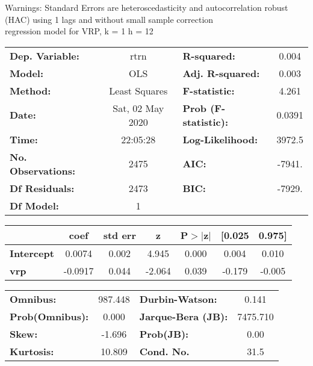 Warnings: \newline
 [1] Standard Errors are heteroscedasticity and autocorrelation robust (HAC) using 1 lags and without small sample correction\\ 

regression model for VRP, k = 1 h = 12\begin{center}
\begin{tabular}{lclc}
\toprule
\textbf{Dep. Variable:}    &       rtrn       & \textbf{  R-squared:         } &     0.004   \\
\textbf{Model:}            &       OLS        & \textbf{  Adj. R-squared:    } &     0.003   \\
\textbf{Method:}           &  Least Squares   & \textbf{  F-statistic:       } &     4.261   \\
\textbf{Date:}             & Sat, 02 May 2020 & \textbf{  Prob (F-statistic):} &   0.0391    \\
\textbf{Time:}             &     22:05:28     & \textbf{  Log-Likelihood:    } &    3972.5   \\
\textbf{No. Observations:} &        2475      & \textbf{  AIC:               } &    -7941.   \\
\textbf{Df Residuals:}     &        2473      & \textbf{  BIC:               } &    -7929.   \\
\textbf{Df Model:}         &           1      & \textbf{                     } &             \\
\bottomrule
\end{tabular}
\begin{tabular}{lcccccc}
                   & \textbf{coef} & \textbf{std err} & \textbf{z} & \textbf{P$> |$z$|$} & \textbf{[0.025} & \textbf{0.975]}  \\
\midrule
\textbf{Intercept} &       0.0074  &        0.002     &     4.945  &         0.000        &        0.004    &        0.010     \\
\textbf{vrp}       &      -0.0917  &        0.044     &    -2.064  &         0.039        &       -0.179    &       -0.005     \\
\bottomrule
\end{tabular}
\begin{tabular}{lclc}
\textbf{Omnibus:}       & 987.448 & \textbf{  Durbin-Watson:     } &    0.141  \\
\textbf{Prob(Omnibus):} &   0.000 & \textbf{  Jarque-Bera (JB):  } & 7475.710  \\
\textbf{Skew:}          &  -1.696 & \textbf{  Prob(JB):          } &     0.00  \\
\textbf{Kurtosis:}      &  10.809 & \textbf{  Cond. No.          } &     31.5  \\
\bottomrule
\end{tabular}
\end{center}

